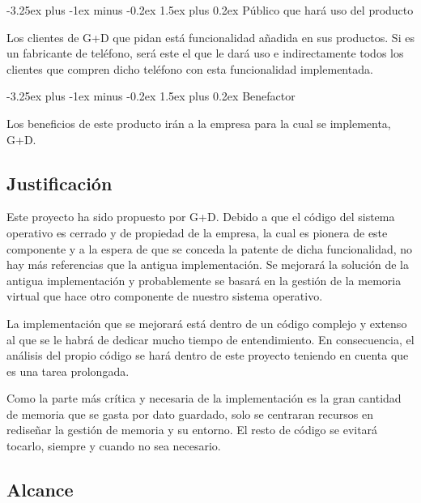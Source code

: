 \documentclass[12pt]{article}
\makeatletter
\renewcommand{\paragraph}{\@startsection{paragraph}{4}{0ex}%
   {-3.25ex plus -1ex minus -0.2ex}%
   {1.5ex plus 0.2ex}%
   {\normalfont\normalsize\bfseries}}
\makeatother
\begin{document}
    \paragraph{Público que hará uso del producto}

    Los clientes de G+D que pidan está funcionalidad añadida en sus productos. Si es un fabricante de teléfono, será este el que le dará uso e indirectamente todos los clientes que compren dicho teléfono con esta funcionalidad implementada.

    \paragraph{Benefactor}

    Los beneficios de este producto irán a la empresa para la cual se implementa, G+D.

    \subsection{Justificación}
    
    Este proyecto ha sido propuesto por G+D. Debido a que el código del sistema operativo es cerrado y de propiedad de la empresa, la cual es pionera de este componente y a la espera de que se conceda la patente de dicha funcionalidad, no hay más referencias que la antigua implementación. Se mejorará la solución de la antigua implementación y probablemente se basará en la gestión de la memoria virtual que hace otro componente de nuestro sistema operativo.
    
    \vspace{4mm}
    
    La implementación que se mejorará está dentro de un código complejo y extenso al que se le habrá de dedicar mucho tiempo de entendimiento. En consecuencia, el análisis del propio código se hará dentro de este proyecto teniendo en cuenta que es una tarea prolongada.
    
    \vspace{4mm}
    
    Como la parte más crítica y necesaria de la implementación es la gran cantidad de memoria que se gasta por dato guardado, solo se centraran recursos en rediseñar la gestión de memoria y su entorno. El resto de código se evitará tocarlo, siempre y cuando no sea necesario.
    \clearpage
    \subsection{Alcance}
\end{document}
